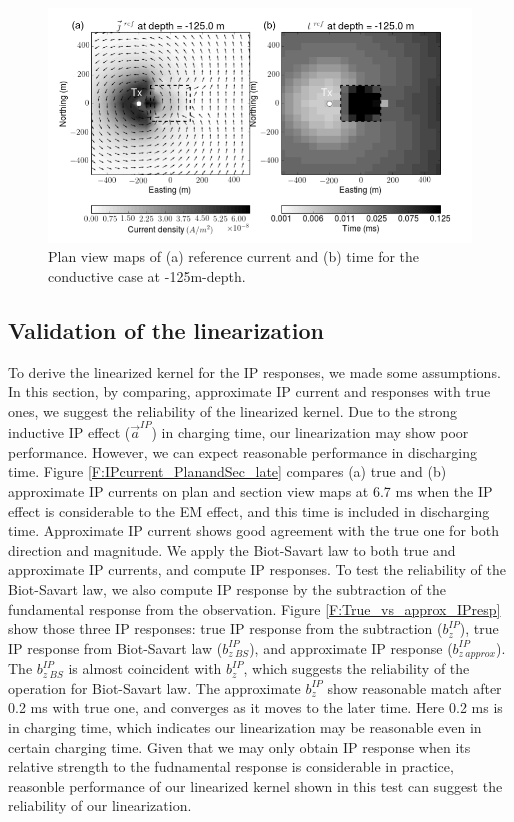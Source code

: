 \documentclass[a4paper, 11pt]{article}
\newcommand{\bzip}{b_z^{IP}}
\begin{document}
\begin{figure}[htb]
  \centering
  \includegraphics[width=1\textwidth]{figures/Jref_tref.png}
  \caption{Plan view maps of (a) reference current and (b) time for the conductive case at -125m-depth.}
  \label{F:Jref_tref}
\end{figure}
\clearpage

\subsection{Validation of the linearization}
To derive the linearized kernel for the IP responses, we made some assumptions. 
In this section, by comparing, approximate IP current and responses with true ones, we suggest the reliability of the linearized kernel. 
Due to the strong inductive IP effect ($\vec{a}^{IP}$) in charging time, our linearization may show poor performance. 
However, we can expect reasonable performance in discharging time. 
Figure \ref{F:IPcurrent_PlanandSec_late} compares (a) true and (b) approximate IP currents on plan and section view maps at 6.7 ms when the IP effect is considerable to the EM effect, and this time is included in discharging time. 
Approximate IP current shows good agreement with the true one for both direction and magnitude. 
We apply the Biot-Savart law to both true and approximate IP currents, and compute IP responses. 
To test the reliability of the Biot-Savart law, we also compute IP response by the subtraction of the fundamental response from the observation. 
Figure \ref{F:True_vs_approx_IPresp} show those three IP responses: true IP response from the subtraction ($b_z^{IP}$), true IP response from Biot-Savart law ($b_{z \ BS}^{IP}$), and approximate IP response ($b_{z \ approx}^{IP}$). 
The $b^{IP}_{z \ BS}$ is almost coincident with $\bzip$, which suggests the reliability of the operation for Biot-Savart law. 
The approximate $\bzip$ show reasonable match after 0.2 ms with true one, and converges as it moves to the later time. 
Here 0.2 ms is in charging time, which indicates our linearization may be reasonable even in certain charging time. 
Given that we may only obtain IP response when its relative strength to the fudnamental response is considerable in practice, reasonble performance of our linearized kernel shown in this test can suggest the reliability of our linearization.
\end{document}
